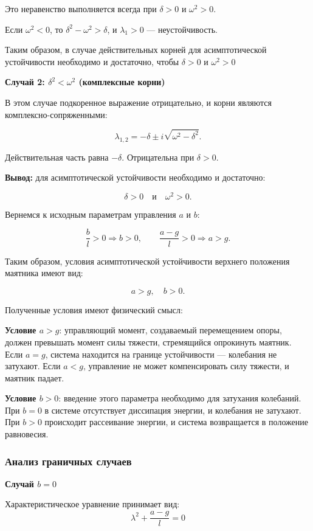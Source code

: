 \documentclass[a4paper, 12pt]{article}
\begin{document}
Это неравенство выполняется всегда при \(\delta > 0\) и \(\omega^2 > 0\).

Если \(\omega^2 < 0\), то \(\delta^2 - \omega^2 > \delta\), и \(\lambda_1 > 0\) — неустойчивость.

Таким образом, в случае действительных корней для асимптотической устойчивости необходимо и достаточно, чтобы \(\delta > 0\) и \(\omega^2 > 0\)

\textbf{Случай 2: \( \delta^2 < \omega^2 \) (комплексные корни)}

В этом случае подкоренное выражение отрицательно, и корни являются комплексно-сопряженными:

\[
\lambda_{1,2} = -\delta \pm i\sqrt{\omega^2 - \delta^2}.
\]

Действительная часть равна \(-\delta\). Отрицательна при \(\delta > 0\).

\textbf{Вывод:} для асимптотической устойчивости необходимо и достаточно:

\[
\delta > 0 \quad \text{и} \quad \omega^2 > 0.
\]

Вернемся к исходным параметрам управления $a$ и $b$:

\[
\frac{b}{l} > 0 \Rightarrow b > 0,\qquad
\frac{a - g}{l} > 0 \Rightarrow a > g.
\]

Таким образом, условия асимптотической устойчивости верхнего положения маятника имеют вид:

\[
a > g, \quad b > 0.
\]

Полученные условия имеют физический смысл:

\textbf{Условие $a>g$}: управляющий момент, создаваемый перемещением опоры, должен превышать момент силы тяжести, стремящийся опрокинуть маятник. Если $a=g$, система находится на границе устойчивости — колебания не затухают. Если $a<g$, управление не может компенсировать силу тяжести, и маятник падает.

\textbf{Условие $b>0$}: введение этого параметра необходимо для затухания колебаний. При $b=0$ в системе отсутствует диссипация энергии, и колебания не затухают. При $b>0$ происходит рассеивание энергии, и система возвращается в положение равновесия.

\subsubsection{Анализ граничных случаев}
\textbf{Случай $b=0$}

Характеристическое уравнение принимает вид:
\begin{equation}
\lambda^2 + \frac{a - g}{l} = 0
\end{equation}
\end{document}
